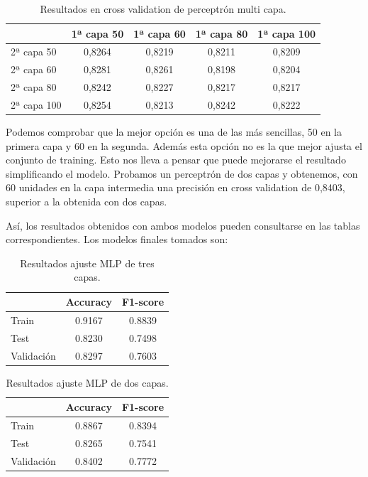 \documentclass[11pt,a4paper]{article}
\begin{document}
\begin{table}[h]
\begin{center}
\begin{tabular}{|l|c|c|c|c|}
\hline

  & 1ª capa 50 & 1ª capa 60 & 1ª capa 80 & 1ª capa 100 \\ \hline
  2ª capa 50 & 0,8264 & 0,8219 & 0,8211 & 0,8209\\
  2ª capa 60 & 0,8281 & 0,8261 & 0,8198 & 0,8204\\
  2ª capa 80 & 0,8242 & 0,8227 & 0,8217 & 0,8217\\
  2ª capa 100 & 0,8254 & 0,8213 & 0,8242 & 0,8222\\\hline
\end{tabular}
\caption{Resultados en cross validation de perceptrón multi capa.}
\end{center}
\end{table}

Podemos comprobar que la mejor opción es una de las más sencillas, 50 en la primera capa y 60 en la segunda. Además esta opción no es la que mejor ajusta el conjunto de training. Esto nos lleva a pensar que puede mejorarse el resultado simplificando el modelo. Probamos un perceptrón de dos capas y obtenemos, con 60 unidades en la capa intermedia una precisión en cross validation de 0,8403, superior a la obtenida con dos capas.

Así, los resultados obtenidos con ambos modelos pueden consultarse en las tablas correspondientes. Los modelos finales tomados son:

\begin{table}[h]
\begin{center}
\begin{tabular}{|l|c|c|}
\hline
   & Accuracy & F1-score \\ \hline
Train & 0.9167 & 0.8839 \\
  Test & 0.8230 & 0.7498  \\
  Validación & 0.8297 & 0.7603  \\\hline\end{tabular}
\caption{Resultados ajuste MLP de tres capas.}

\end{center}
\end{table}

\begin{table}[h]
\begin{center}
\begin{tabular}{|l|c|c|}
\hline
   & Accuracy & F1-score \\ \hline
Train & 0.8867 & 0.8394 \\
  Test & 0.8265 & 0.7541  \\
  Validación & 0.8402 & 0.7772  \\\hline
\end{tabular}
\caption{Resultados ajuste MLP de dos capas.}

\end{center}
\end{table}
\end{document}
